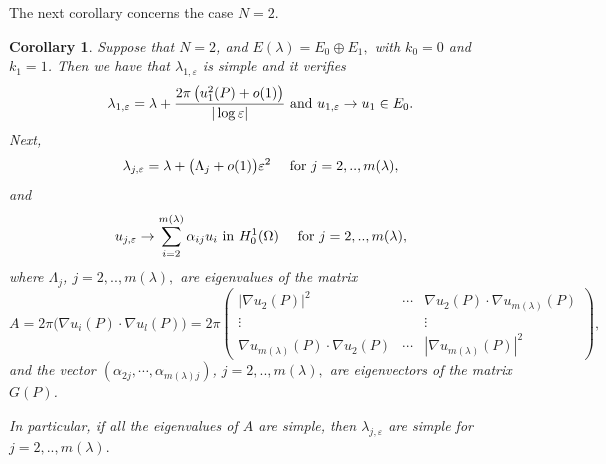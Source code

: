 \documentclass[11pt,reqno]{article}
\newtheorem{cor}[teo]{Corollary}
\numberwithin{equation}{section}
\newcommand\e\varepsilon
\newcommand\la\lambda
\newcommand\La\Lambda
\renewcommand\O\Omega
\begin{document}
    The next corollary concerns the case $N=2$.
     \begin{cor}\label{cor1510-1}
		 Suppose that $N=2$, and
		$E(\la)=E_0\oplus E_1,$
        with $k_0=0$ and $k_1=1$.
		Then we have that $\la_{1,\e}$ is simple and it verifies 
		\begin{equation}\label{2d11}
			\la_{1,\e}=\la +\frac{2\pi\left(u_1^2(P)+o(1)\right)}{|\log\e|}\hbox{ and }u_{1,\e}\to u_1\in E_0.
		\end{equation}
		Next, 
		\begin{equation}\label{2d12}
			\la_{j,\e}=\la +\big(\La_j+o(1)\big)\e^2\quad\hbox{ for }j=2,..,m(\la),
		\end{equation}
        and
\begin{equation}
			u_{j,\e}\to \sum_{i=2}^{m(\lambda)}\alpha_{ij}u_i\hbox{ in } H^1_0(\O)\quad\hbox{ for }j=2,..,m(\la),
		\end{equation}       
		where $\La_j$, $j=2,..,m(\la),$ are eigenvalues of the matrix 
			\begin{equation}\label{2mat}
				A=2\pi\big(\nabla u_i(P)\cdot\nabla u_l(P)
				\big)=2\pi\begin{pmatrix}
					|\nabla u_2(P)|^2&\cdots&\nabla u_2(P)\cdot\nabla u_{m(\la)}(P)\\
					\vdots&  &\vdots\\
					\nabla u_{m(\la)}(P)\cdot\nabla u_2(P)&\cdots&
					|\nabla u_{m(\la)}(P)|^2
				\end{pmatrix},
			\end{equation}
             and the vector $(\alpha_{2j},\cdots,\alpha_{m(\lambda)j})$, $j=2,..,m(\la),$ are eigenvectors of the matrix $G(P)$.
             
		In particular, if all the eigenvalues of $A$ are simple, then $\la_{j,\e}$ are simple for  $j=2,..,m(\la).$ 
	\end{cor}
\end{document}
